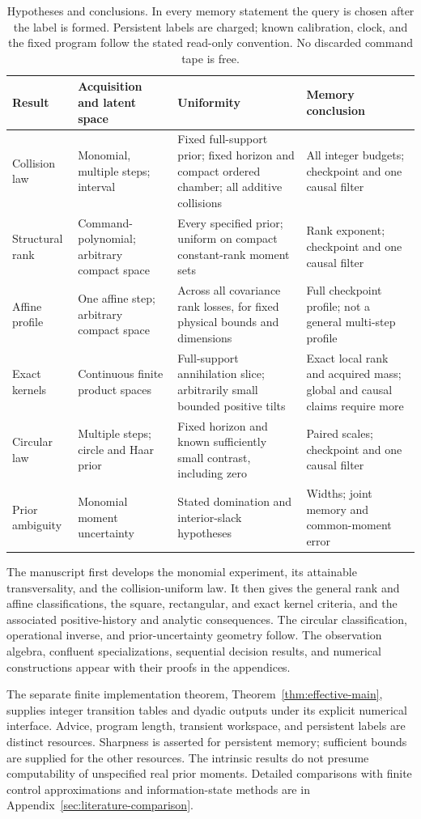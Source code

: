 \begin{table}[tbp]
\centering\footnotesize
\setlength{\tabcolsep}{4pt}
\begin{tabular}{@{}p{}p{}p{}p{}@{}}
\toprule
Result & Acquisition and latent space & Uniformity & Memory conclusion\\
\midrule
Collision law & Monomial, multiple steps; interval & Fixed full-support
prior; fixed horizon and compact ordered chamber; all additive collisions
& All integer budgets; checkpoint and one causal filter\\[3pt]
Structural rank & Command-polynomial; arbitrary compact space & Every
specified prior; uniform on compact constant-rank moment sets & Rank
exponent; checkpoint and one causal filter\\[3pt]
Affine profile & One affine step; arbitrary compact space & Across all
covariance rank losses, for fixed physical bounds and dimensions & Full
checkpoint profile; not a general multi-step profile\\[3pt]
Exact kernels & Continuous finite product spaces & Full-support
annihilation slice; arbitrarily small bounded positive tilts & Exact local
rank and acquired mass; global and causal claims require more\\[3pt]
Circular law & Multiple steps; circle and Haar prior & Fixed horizon and
known sufficiently small contrast, including zero & Paired scales;
checkpoint and one causal filter\\[3pt]
Prior ambiguity & Monomial moment uncertainty & Stated domination and
interior-slack hypotheses & Widths; joint memory and common-moment error\\
\bottomrule
\end{tabular}
\caption{Hypotheses and conclusions. In every memory statement the query
is chosen after the label is formed. Persistent labels are charged;
known calibration, clock, and the fixed program follow the stated
read-only convention. No discarded command tape is free.}
\label{tab:scope}
\end{table}

The manuscript first develops the monomial experiment, its attainable
transversality, and the collision-uniform law. It then gives the general
rank and affine classifications, the square, rectangular, and exact
kernel criteria, and the associated positive-history and analytic
consequences. The circular classification, operational inverse, and
prior-uncertainty geometry follow. The observation algebra, confluent
specializations, sequential decision results, and numerical constructions
appear with their proofs in the appendices.

The separate finite implementation theorem,
Theorem~\ref{thm:effective-main}, supplies integer transition tables and
dyadic outputs under its explicit numerical interface. Advice, program
length, transient workspace, and persistent labels are distinct resources.
Sharpness is asserted for persistent memory; sufficient bounds are
supplied for the other resources. The intrinsic results do not presume
computability of unspecified real prior moments. Detailed comparisons
with finite control approximations and information-state methods are in
Appendix~\ref{sec:literature-comparison}.
